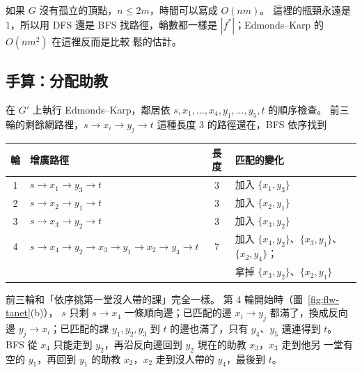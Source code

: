 如果 $G$ 沒有孤立的頂點，$n \le 2m$，時間可以寫成 $O(nm)$。 這裡的瓶頸永遠是 $1$，所以用
DFS 還是 BFS 找路徑，輪數都一樣是 $|f^{*}|$；Edmonds--Karp 的 $O(nm^2)$ 在這裡反而是比較
鬆的估計。

\subsection{手算：分配助教}
\label{sec:flw-match-trace}

在 $G'$ 上執行 Edmonds--Karp，鄰居依 $s, x_1, \ldots, x_4, y_1, \ldots, y_5, t$ 的順序檢查。
前三輪的剩餘網路裡，$s \to x_i \to y_j \to t$ 這種長度 $3$ 的路徑還在，BFS 依序找到

\begin{center}
\small
\begin{tabular}{clcl}
\toprule
輪 & 增廣路徑 & 長度 & 匹配的變化 \\
\midrule
1 & $s \to x_1 \to y_3 \to t$ & 3 & 加入 $\{x_1, y_3\}$ \\
2 & $s \to x_2 \to y_1 \to t$ & 3 & 加入 $\{x_2, y_1\}$ \\
3 & $s \to x_3 \to y_2 \to t$ & 3 & 加入 $\{x_3, y_2\}$ \\
4 & $s \to x_4 \to y_2 \to x_3 \to y_1 \to x_2 \to y_4 \to t$ & 7 &
加入 $\{x_4, y_2\}$、$\{x_3, y_1\}$、$\{x_2, y_4\}$；\\
& & & 拿掉 $\{x_3, y_2\}$、$\{x_2, y_1\}$ \\
\bottomrule
\end{tabular}
\end{center}

前三輪和「依序挑第一堂沒人帶的課」完全一樣。 第 4 輪開始時（圖~\ref{fig:flw-tanet}(b)），
$s$ 只剩 $s \to x_4$ 一條順向邊；已匹配的邊 $x_i \to y_j$ 都滿了，換成反向邊
$y_j \to x_i$；已匹配的課 $y_1, y_2, y_3$ 到 $t$ 的邊也滿了，只有 $y_4$、$y_5$ 還連得到
$t$。 BFS 從 $x_4$ 只能走到 $y_2$，再沿反向邊回到 $y_2$ 現在的助教 $x_3$，$x_3$ 走到他另
一堂有空的 $y_1$，再回到 $y_1$ 的助教 $x_2$，$x_2$ 走到沒人帶的 $y_4$，最後到 $t$。

